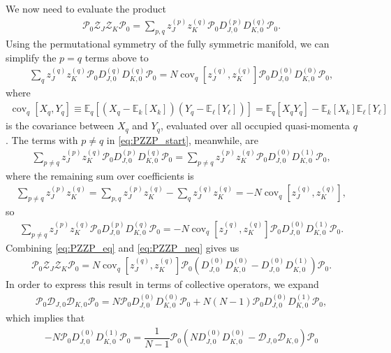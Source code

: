 \documentclass[nofootinbib,notitlepage,11pt]{revtex4-2}
\newcommand{\f}[2]{\dfrac{#1}{#2}} %
\newcommand{\p}[1]{\left(#1\right)} %
\renewcommand{\sp}[1]{\left[#1\right]} %
\newcommand{\1}{\mathds{1}}
\newcommand{\D}{\mathcal{D}}
\renewcommand{\P}{\mathcal{P}}
\newcommand{\Z}{\mathcal{Z}}
\newcommand{\EE}{\mathbb{E}}
\DeclareMathOperator{\cov}{cov}
\begin{document}
We now need to evaluate the product
\begin{align}
  \P_0 \Z_J \Z_K \P_0
  = \sum_{p,q} z_J^{(p)} z_K^{(q)} \P_0 D_{J,0}^{(p)} D_{K,0}^{(q)} \P_0.
  \label{eq:PZZP_start}
\end{align}
Using the permutational symmetry of the fully symmetric manifold, we
can simplify the $p=q$ terms above to
\begin{align}
  \sum_q z_J^{(q)} z_K^{(q)}
  \P_0 D_{J,0}^{(q)} D_{K,0}^{(q)} \P_0
  = N \cov_q\sp{z_J^{(q)},z_K^{(q)}}
  \P_0 D_{J,0}^{(0)} D_{K,0}^{(0)} \P_0,
  \label{eq:PZZP_eq}
\end{align}
where
\begin{align}
  \cov_q\sp{X_q,Y_q}
  \equiv \EE_q\sp{\p{X_q-\EE_k\sp{X_k}}\p{Y_q-\EE_\ell\sp{Y_\ell}}}
  = \EE_q\sp{X_q Y_q} - \EE_k\sp{X_k} \EE_\ell\sp{Y_\ell}
  \label{eq:cov}
\end{align}
is the covariance between $X_q$ and $Y_q$, evaluated over all occupied
quasi-momenta $q$.  The terms with $p\ne q$ in \eqref{eq:PZZP_start},
meanwhile, are
\begin{align}
  \sum_{p\ne q} z_J^{(p)} z_K^{(q)}
  \P_0 D_{J,0}^{(p)} D_{K,0}^{(q)} \P_0
  = \sum_{p\ne q} z_J^{(p)} z_K^{(q)}
  \P_0 D_{J,0}^{(0)} D_{K,0}^{(1)} \P_0,
\end{align}
where the remaining sum over coefficients is
\begin{align}
  \sum_{p\ne q} z_J^{(p)} z_K^{(q)}
  = \sum_{p,q} z_J^{(p)} z_K^{(q)} - \sum_q z_J^{(q)} z_K^{(q)}
  = - N \cov_q\sp{z_J^{(q)},z_K^{(q)}},
\end{align}
so
\begin{align}
  \sum_{p\ne q} z_J^{(p)} z_K^{(q)}
  \P_0 D_{J,0}^{(p)} D_{K,0}^{(q)} \P_0
  = - N \cov_q\sp{z_J^{(q)},z_K^{(q)}}
  \P_0 D_{J,0}^{(0)} D_{K,0}^{(1)} \P_0.
  \label{eq:PZZP_neq}
\end{align}
Combining \eqref{eq:PZZP_eq} and \eqref{eq:PZZP_neq} gives us
\begin{align}
  \P_0 \Z_J \Z_K \P_0
  = N \cov_q\sp{z_J^{(q)},z_K^{(q)}}
  \P_0\p{D_{J,0}^{(0)} D_{K,0}^{(0)}
    - D_{J,0}^{(0)} D_{K,0}^{(1)}} \P_0.
\end{align}
In order to express this result in terms of collective operators, we
expand
\begin{align}
  \P_0 \D_{J,0} \D_{K,0} \P_0
  = N \P_0 D_{J,0}^{(0)} D_{K,0}^{(0)} \P_0
  + N\p{N-1} \P_0 D_{J,0}^{(0)} D_{K,0}^{(1)} \P_0,
\end{align}
which implies that
\begin{align}
  - N \P_0 D_{J,0}^{(0)} D_{K,0}^{(1)} \P_0
  = \f1{N-1} \P_0 \p{N D_{J,0}^{(0)} D_{K,0}^{(0)}
    - \D_{J,0} \D_{K,0}} \P_0
\end{align}
\end{document}

